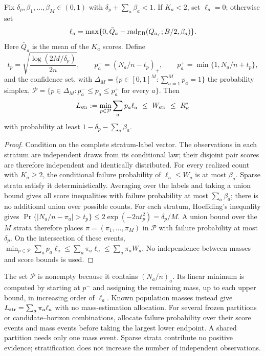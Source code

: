 \begin{theorem}
\label{thm:stratified-certificate}
Fix $\delta_p,\beta_1,\ldots,\beta_M\in(0,1)$ with
$\delta_p+\sum_a\beta_a<1$. If $K_a<2$, set $\ell_a=0$; otherwise set
\[
 \ell_a=\max\{0,\bar Q_a-
       \operatorname{rad}_{\rm EB}(Q_{a,\cdot};B/2,\beta_a)\}.
\]
Here $\bar Q_a$ is the mean of the $K_a$ scores. Define
\[
 t_p=\sqrt{\frac{\log(2M/\delta_p)}{2n}},\qquad
 p_a^-=(N_a/n-t_p)_+,\qquad
 p_a^+=\min\{1,N_a/n+t_p\},
\]
and the confidence set, with
$\Delta_M=\{p\in[0,1]^M:\sum_{a=1}^M p_a=1\}$ the probability simplex,
$\mathcal P=\{p\in\Delta_M:p_a^-\leq p_a\leq p_a^+
\text{ for every }a\}$. Then
\begin{equation}
 L_{\rm str}:=\min_{p\in\mathcal P}\sum_a p_a\ell_a
 \ \leq\ W_{\rm str}\ \leq\ R^*_\kappa
 \label{eq:stratified-certificate}
\end{equation}
with probability at least $1-\delta_p-\sum_a\beta_a$.
\end{theorem}

\begin{proof}
Condition on the complete stratum-label vector. The observations in each
stratum are independent draws from its conditional law; their disjoint pair
scores are therefore independent and identically distributed. For every
realized count with $K_a\geq2$, the conditional failure probability of
$\ell_a\leq W_a$ is at most $\beta_a$. Sparse strata satisfy it
deterministically. Averaging over the labels and taking a union bound gives
all score inequalities with failure probability at most $\sum_a\beta_a$;
there is no additional union over possible counts.
For each stratum, Hoeffding's inequality gives
$\Pr\{|N_a/n-\pi_a|>t_p\}\leq2\exp(-2nt_p^2)=\delta_p/M$.
A union bound over the $M$ strata therefore places
$\pi=(\pi_1,\ldots,\pi_M)$ in $\mathcal P$ with failure probability
at most $\delta_p$.
On the intersection of these events,
$\min_{p\in\mathcal P}\sum_a p_a\ell_a
\leq\sum_a\pi_a\ell_a\leq\sum_a\pi_a W_a$.
No independence between masses and score bounds is used.
\end{proof}

The set $\mathcal P$ is nonempty because it contains $(N_a/n)_a$.
Its linear minimum is computed by starting at $p^-$ and assigning the
remaining mass, up to each upper bound, in increasing order of $\ell_a$.
Known population masses instead give $L_{\rm str}=\sum_a\pi_a\ell_a$
with no mass-estimation allocation. For several frozen partitions or
candidate--horizon combinations, allocate failure probability over their
score events and mass events before taking the largest lower endpoint.
A shared partition needs only one mass event. Sparse strata contribute no
positive evidence; stratification does not increase the number of independent
observations.

